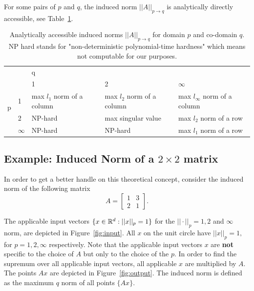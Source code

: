 \documentclass{article}
\begin{document}
For some pairs of $p$ and $q$, the induced norm $||A||_{p \to q}$ is analytically directly accessible, see Table~\ref{tab:induced_norm}. 

\begin{table}[ht]
\caption{Analytically accessible induced norms $||A||_{p \to q}$ for domain $p$ and co-domain $q$. NP hard stands for "non-deterministic polynomial-time hardness" which means not computable for our purposes.}
\begin{tabular}{ll|p{3cm}p{3cm}p{3cm}}
                          & & \multicolumn{3}{l}{\hspace{5cm} q} \\ 
\multirow{4}{*}{p} &                       & 1 & 2  & $\infty$ \\ \cline{2-5}
                          & 1 & max $l_1$ norm of a column & max $l_2$ norm of a column & max $l_\infty$ norm of a column \\
                          & 2                     & NP-hard & max singular value  & max $l_2$ norm of a row \\
                          & $\infty$ & NP-hard & NP-hard & max $l_1$ norm of a row     
\end{tabular}
\label{tab:induced_norm}
\end{table}


\subsection{Example: Induced Norm of a $2 \times 2$ matrix}
In order to get a better handle on this theoretical concept, consider the induced norm of the following matrix 
$$A = 
\begin{bmatrix}
1 & 3 \\
2 & 1
\end{bmatrix}.$$

The applicable input vectors $\{x \in \mathbb{R}^d: ||x||_p = 1\}$ for the $||\cdot||_p = 1, 2$ and $\infty$ norm, are depicted in Figure~\ref{fig:input}. All $x$ on the unit circle have $||x||_p = 1,$ for $p = 1, 2, \infty$ respectively. Note that the applicable input vectors $x$ are \textbf{not} specific to the choice of $A$ but only to the choice of the $p$.
In order to find the supremum over all applicable input vectors, all applicable $x$ are  multiplied by $A$. The points $Ax$ are depicted in Figure~\ref{fig:output}. The induced norm is defined as the maximum $q$ norm of all points $\{Ax\}$.
\end{document}
